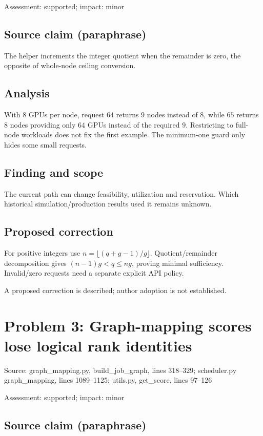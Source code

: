 \documentclass[11pt]{article}
\begin{document}
Assessment: supported; impact: minor

\subsection*{Source claim (paraphrase)}

The helper increments the integer quotient when the remainder is zero, the opposite of whole-node ceiling conversion.

\subsection*{Analysis}

With \(8\) GPUs per node, request \(64\) returns \(9\) nodes instead of \(8\), while \(65\) returns \(8\) nodes providing only \(64\) GPUs instead of the required \(9\). Restricting to full-node workloads does not fix the first example. The minimum-one guard only hides some small requests.

\subsection*{Finding and scope}

The current path can change feasibility, utilization and reservation. Which historical simulation/production results used it remains unknown.

\subsection*{Proposed correction}

For positive integers use \(n=\lfloor(q+g-1)/g\rfloor\). Quotient/remainder decomposition gives \((n-1)g<q\le ng\), proving minimal sufficiency. Invalid/zero requests need a separate explicit API policy.

A proposed correction is described; author adoption is not established.

\section*{Problem 3: Graph-mapping scores lose logical rank identities}

Source: graph\_mapping.py, build\_job\_graph, lines 318–329; scheduler.py graph\_mapping, lines 1089–1125; utils.py, get\_score, lines 97–126

Assessment: supported; impact: minor

\subsection*{Source claim (paraphrase)}
\end{document}
